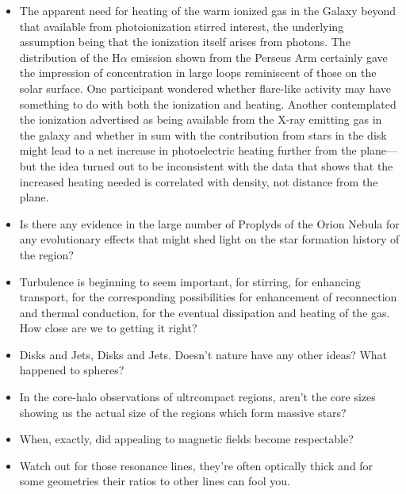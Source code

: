 \documentclass[proceedings]{rmaa}
\begin{document}
\begin{itemize}
\item  The apparent need for heating of the warm ionized gas in the Galaxy  
beyond that available from photoionization stirred interest, the 
underlying assumption being that the ionization itself arises from 
photons.  The distribution of the H$\alpha$ emission shown from the Perseus 
Arm certainly gave the impression of concentration in large loops 
reminiscent of those on the solar surface.  One participant wondered 
whether flare-like activity may have something to do with both the 
ionization and heating.  Another contemplated the ionization advertised 
as being available from the X-ray emitting gas in the galaxy and whether  
in sum with the contribution from stars in the disk might lead to a net 
increase in photoelectric heating further from the plane---but the idea 
turned out to be inconsistent with the data that shows that the increased 
heating needed is correlated with density, not distance from the plane.

\item  Is there any evidence in the large number of Proplyds of the Orion 
Nebula for any evolutionary effects that might shed light on the star 
formation history of the region?

\item  Turbulence is beginning to seem important, for stirring, for enhancing 
transport, for the corresponding possibilities for enhancement of 
reconnection and thermal conduction, for the eventual dissipation and 
heating of the gas.  How close are we to getting it right?

\item  Disks and Jets, Disks and Jets.  Doesn't nature have any other ideas?  
What happened to spheres?

\item In the core-halo observations of ultrcompact  regions,
  aren't the core sizes showing us the actual size of the regions
  which form massive stars?

\item  When, exactly, did appealing to magnetic fields become respectable?

\item  Watch out for those resonance lines, they're often optically thick and 
for some geometries their ratios to other lines can fool you.
\end{itemize}
\end{document}
